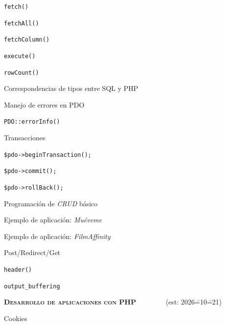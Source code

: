 \begin{longenum}
\begin{longenum}
\begin{longenum}
            \begin{longenum}
                \item \texttt{fetch()}
                \item \texttt{fetchAll()}
                \item \texttt{fetchColumn()}
                \item \texttt{execute()}
                \item \texttt{rowCount()}
            \end{longenum}
            \item Correspondencias de tipos entre SQL y PHP
            \item Manejo de errores en PDO
            \begin{longenum}
                \item \texttt{PDO::errorInfo()}
            \end{longenum}
            \item Transacciones
            \begin{longenum}
                \item \texttt{\$pdo->beginTransaction();}
                \item \texttt{\$pdo->commit();}
                \item \texttt{\$pdo->rollBack();}
            \end{longenum}
        \end{longenum}
        \item Programación de \textit{CRUD} básico
        \begin{longenum}
            \item Ejemplo de aplicación: \textit{Muéveme} 
            \item Ejemplo de aplicación: \textit{FilmAffinity} 
        \end{longenum}
        \item Post/Redirect/Get
        \item \texttt{header()}
        \begin{longenum}
            \item \texttt{output\_buffering}
        \end{longenum}
    \end{longenum}
    \item \textbf{\textsc{Desarrollo de aplicaciones con PHP}} \ \ \ \ \ \ \ \ (est: 2026\==10\==21)
    \begin{longenum}
        \item Cookies

\end{longenum}
\end{longenum}

